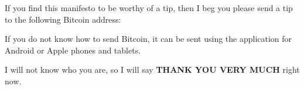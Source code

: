If you find this manifesto to be worthy of a tip, then I beg you please send a tip to the following Bitcoin address:

\bigskip

\quad
{}

\bigskip

If you do not know how to send Bitcoin, it can be sent using the  application for Android or Apple phones and tablets.

I will not know who you are, so I will say \textbf{THANK YOU VERY MUCH} right now.

